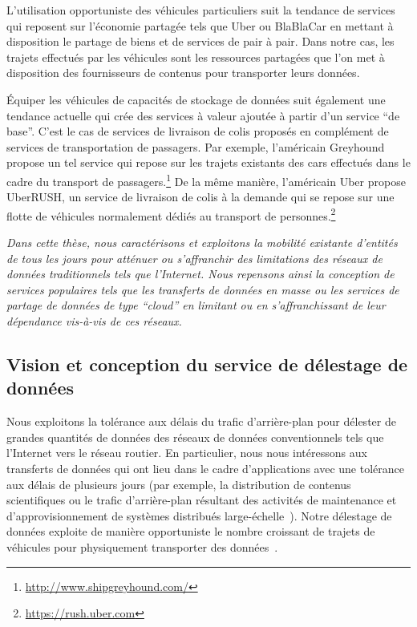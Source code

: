 L’utilisation opportuniste des véhicules particuliers suit la tendance de services qui reposent sur l’économie partagée tels que Uber ou BlaBlaCar en mettant à disposition le partage de biens et de services de pair à pair. Dans notre cas, les trajets effectués par les véhicules sont les ressources partagées que l’on met à disposition des fournisseurs de contenus pour transporter leurs données. 
 
 
Équiper les véhicules de capacités de stockage de données suit également une tendance actuelle qui crée des services à valeur ajoutée à partir d'un service ``de base''. C’est le cas de services de livraison de colis proposés en complément de services de transportation de passagers. Par exemple, l’américain Greyhound propose un tel service qui repose sur les trajets existants des cars effectués dans le cadre du transport de passagers.\footnote{\url{http://www.shipgreyhound.com/}} De la même manière, l’américain Uber propose UberRUSH, un service de livraison de colis à la demande qui se repose sur une flotte de véhicules normalement dédiés au transport de personnes.\footnote{\url{https://rush.uber.com}} 
 
 
\begin{displayquote} 
    \textit{Dans cette thèse, nous caractérisons et exploitons la mobilité existante d’entités de tous les jours pour atténuer ou s'affranchir des limitations des réseaux de données traditionnels tels que l'Internet. Nous repensons ainsi la conception de services populaires tels que les transferts de données en masse ou les services de partage de données de type ``cloud'' en limitant ou en s’affranchissant de leur dépendance vis-à-vis de ces réseaux.}
\end{displayquote} 
 
 
 
 
\subsection{Vision et conception du service de délestage de données} 
 
 
Nous exploitons la tolérance aux délais du trafic d’arrière-plan pour délester de grandes quantités de données des réseaux de données conventionnels tels que l’Internet vers le réseau routier. En particulier, nous nous intéressons aux transferts de données qui ont lieu dans le cadre d’applications avec une tolérance aux délais de plusieurs jours (par exemple, la distribution de contenus scientifiques ou le trafic d’arrière-plan résultant des activités de maintenance et d’approvisionnement de systèmes distribués large-échelle~\cite{laoutaris2009delay}). Notre délestage de données exploite de manière opportuniste le nombre croissant de trajets de véhicules pour physiquement transporter des données~\cite{le2010mobilite}. 
 
